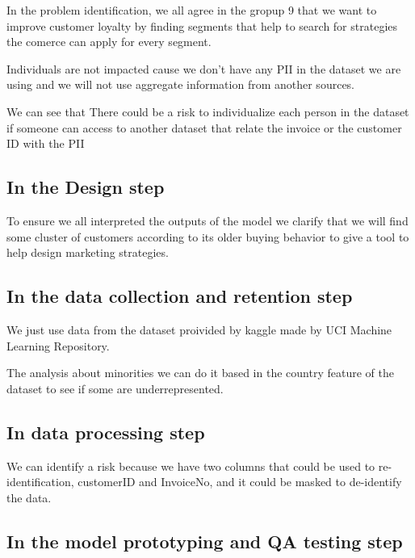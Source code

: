 In the problem identification, we all agree in the gropup 9 that we want
to improve customer loyalty by finding segments that help to search for
strategies the comerce can apply for every segment.

Individuals are not impacted cause we don't have any PII in the dataset
we are using and we will not use aggregate information from another
sources.

We can see that There could be a risk to individualize each person in
the dataset if someone can access to another dataset that relate the
invoice or the customer ID with the PII

\hypertarget{in-the-design-step}{%
\subsection{In the Design step}\label{in-the-design-step}}

To ensure we all interpreted the outputs of the model we clarify that we
will find some cluster of customers according to its older buying
behavior to give a tool to help design marketing strategies.

\hypertarget{in-the-data-collection-and-retention-step}{%
\subsection{In the data collection and retention
step}\label{in-the-data-collection-and-retention-step}}

We just use data from the dataset proivided by kaggle made by UCI
Machine Learning Repository.

The analysis about minorities we can do it based in the country feature
of the dataset to see if some are underrepresented.

\hypertarget{in-data-processing-step}{%
\subsection{In data processing step}\label{in-data-processing-step}}

We can identify a risk because we have two columns that could be used to
re-identification, customerID and InvoiceNo, and it could be masked to
de-identify the data.

\hypertarget{in-the-model-prototyping-and-qa-testing-step}{%
\subsection{In the model prototyping and QA testing
step}\label{in-the-model-prototyping-and-qa-testing-step}}

